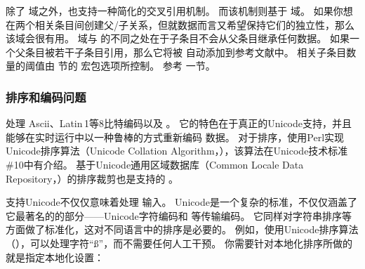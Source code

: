 除了  域之外，\biblatex 也支持一种简化的交叉引用机制。
而该机制则基于  域。
如果你想在两个相关条目间创建父\slash 子关系，但就数据而言又希望保持它们的独立性，那么该域会很有用。
 域与  的不同之处在于子条目不会从父条目继承任何数据。
如果一个父条目被若干子条目引用，那么它将被 \biblatex 自动添加到参考文献中。
相关子条目数量的阈值由  节的  宏包选项所控制。
参考  一节。

\subsubsection{排序和编码问题}%
\label{bib:cav:enc}


\biber 处理 Ascii、Latin\,1等8比特编码以及 \utf。
它的特色在于真正的Unicode支持，并且能够在实时运行中以一种鲁棒的方式重新编码  数据。
对于排序，\biber 使用Perl实现Unicode排序算法（Unicode Collation Algorithm，），该算法在Unicode技术标准\#10中有介绍。
基于Unicode通用区域数据库（Common Locale Data Repository，）的排序裁剪也是支持的 。



支持Unicode不仅仅意味着处理 \utf 输入。
Unicode是一个复杂的标准，不仅仅涵盖了它最著名的的部分——Unicode字符编码和 \utf 等传输编码。
它同样对字符串排序等方面做了标准化，这对不同语言中的排序是必要的。
例如，使用Unicode排序算法（），\biber 可以处理字符“ß”，而不需要任何人工干预。
你需要针对本地化排序所做的就是指定本地化设置：

